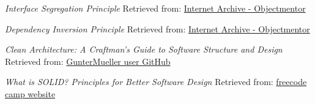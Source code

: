  \emph{Interface Segregation Principle}
\newline
Retrieved from: \href{https://web.archive.org/web/20150905081110/http://www.objectmentor.com/resources/articles/isp.pdf}{Internet Archive - Objectmentor}

 \emph{Dependency Inversion Principle}
\newline
Retrieved from: \href{https://web.archive.org/web/20150905081103/http://www.objectmentor.com/resources/articles/dip.pdf}{Internet Archive - Objectmentor}

 \emph{Clean Architecture: A Craftman's Guide to Software Structure and Design}
\newline
Retrieved from: \href{https://github.com/GunterMueller/Books-3/blob/master/Clean%20Architecture%20A%20Craftsman%20Guide%20to%20Software%20Structure%20and%20Design.pdf}{GunterMueller user GitHub}

 \emph{What is SOLID? Principles for Better Software Design}
\newline
Retrieved from: \href{https://www.freecodecamp.org/news/solid-principles-for-better-software-design/}{freecode camp website}
    
    
